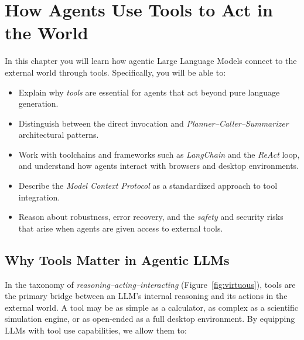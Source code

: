 \chapter{How Agents Use Tools to Act in the World}
\label{sec:tools}\label{chap:tools}

\begin{learningbox}
In this chapter you will learn how agentic Large Language Models connect to the external world through tools. Specifically, you will be able to:
\begin{itemize}[leftmargin=*, nosep]
    \item Explain why {\em tools} are essential for agents that act beyond pure language generation.
    \item Distinguish between the direct invocation and {\em Planner--Caller--Summarizer} architectural patterns.
    \item Work with toolchains and frameworks such as \textit{LangChain} and the \textit{ReAct} loop, and understand how agents interact with browsers and desktop environments.
    \item Describe the \textit{Model Context Protocol} as a standardized approach to tool integration.
    \item Reason about robustness, error recovery, and the {\em safety} and security risks that arise when agents are given access to  external tools.
\end{itemize}
\end{learningbox}

\section{Why Tools Matter in Agentic LLMs}
In the taxonomy of \textit{reasoning–acting–interacting} (Figure~\ref{fig:virtuous}), tools are the primary bridge between an LLM’s internal reasoning and its actions in the external world. A tool may be as simple as a calculator, as complex as a scientific simulation engine, or as open-ended as a full desktop environment. By equipping LLMs with tool use capabilities, we allow them to:

